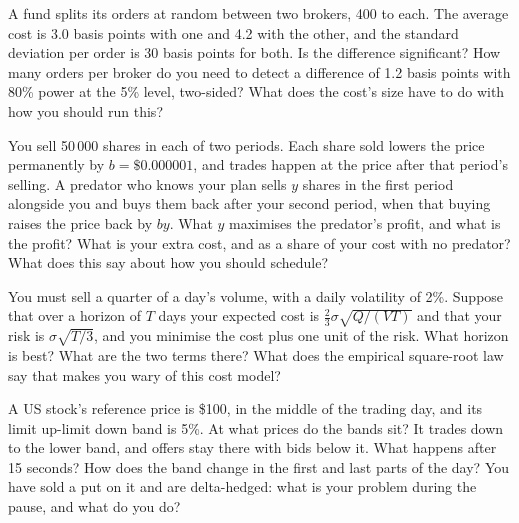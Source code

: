 \begin{question}\label{iq:iv2:markets-and-microstructure:44}
A fund splits its orders at random between two brokers, 400 to each. The average cost is 3.0 basis points with one and 4.2 with the other, and the standard deviation per order is 30 basis points for both. Is the difference significant? How many orders per broker do you need to detect a difference of 1.2 basis points with 80\% power at the 5\% level, two-sided? What does the cost's size have to do with how you should run this?
\end{question}

\begin{question}\label{iq:iv2:markets-and-microstructure:45}
You sell 50\,000 shares in each of two periods. Each share sold lowers the price permanently by $b = \$0.000001$, and trades happen at the price after that period's selling. A predator who knows your plan sells $y$ shares in the first period alongside you and buys them back after your second period, when that buying raises the price back by $by$. What $y$ maximises the predator's profit, and what is the profit? What is your extra cost, and as a share of your cost with no predator? What does this say about how you should schedule?
\end{question}

\begin{question}\label{iq:iv2:markets-and-microstructure:46}
You must sell a quarter of a day's volume, with a daily volatility of 2\%. Suppose that over a horizon of $T$ days your expected cost is $\tfrac23\sigma\sqrt{Q/(VT)}$ and that your risk is $\sigma\sqrt{T/3}$, and you minimise the cost plus one unit of the risk. What horizon is best? What are the two terms there? What does the empirical square-root law say that makes you wary of this cost model?
\end{question}

\begin{question}\label{iq:iv2:markets-and-microstructure:47}
A US stock's reference price is \$100, in the middle of the trading day, and its limit up-limit down band is 5\%. At what prices do the bands sit? It trades down to the lower band, and offers stay there with bids below it. What happens after 15 seconds? How does the band change in the first and last parts of the day? You have sold a put on it and are delta-hedged: what is your problem during the pause, and what do you do?
\end{question}

